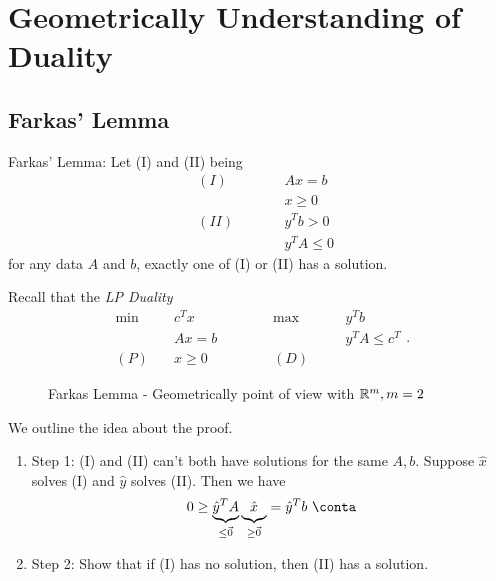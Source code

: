 \section{Geometrically Understanding of Duality}
\subsection{Farkas' Lemma}
\begin{lemma}
	\label{Farkas Lemma}
	Farkas' Lemma: Let (I) and (II) being
	\[
		\begin{alignedat}{3}
			& (I) \qquad&& Ax = b       \\
			&      && x\geq 0      \\
			& (II) \qquad&& y^{T}b > 0 \\
			&      && y^{T}A\leq 0
		\end{alignedat}
	\]
	for any data \(A\) and \(b\), exactly one of (I) or (II) has a solution.
\end{lemma}
\begin{note}
	Recall that the \emph{LP Duality}
	\[
		\begin{alignedat}{5}
			\min~&c^{T}x\qquad\qquad&&\max ~&&y^{T}b\\
			&Ax = b 				&&		&&y^{T}A\leq c^{T}\\
			(P)\quad	&x\geq  0 	&&(D)\quad&&
		\end{alignedat}.
	\]
\end{note}

\begin{figure}[H]
	\centering
	\caption{Farkas Lemma - Geometrically point of view with \(\mathbb{\MakeUppercase{R}}^m, m = 2\) }
	\label{fig:Farkas-lemma}
\end{figure}

\begin{intuition}
	We outline the idea about the proof.
	\begin{enumerate}
		\item Step 1: (I) and (II) can't both have solutions for the same \(A, b\).
		      Suppose \(\hat{x}\) solves (I) and \(\hat{y}\) solves (II). Then we have
		      \[
			      0\geq  \underbrace{\hat{y}^{T} A}_{\leq \vec{0}} \underbrace{\vphantom{\hat{y}^{T}A} \hat{x}}_{\geq \vec{0}} = \hat{y}^{T} b\ \conta
		      \]
		\item Step 2: Show that if (I) has no solution, then (II) has a solution.
	\end{enumerate}
\end{intuition}